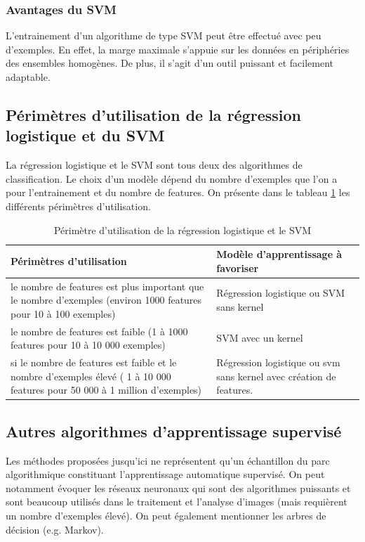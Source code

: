 \subsubsection{Avantages du SVM}
\label{Le Machine Learning: Les différents algorithmes: SVM: Avantage du SVM}
L'entrainement d'un algorithme de type SVM peut être effectué avec peu d'exemples. En effet, la marge maximale s'appuie sur les données en périphéries des ensembles homogènes. De plus, il s'agit d'un outil puissant et facilement adaptable.

\subsection{Périmètres d'utilisation de la régression logistique et du SVM}
\label{Le Machine Learning: Choix de la méthode à utiliser: Comparaison de la régression logistique et le SVM}
La régression logistique et le SVM sont tous deux des algorithmes de classification. Le choix d'un modèle dépend du nombre d'exemples que l'on a pour l'entrainement et du nombre de features. On présente dans le tableau \ref {tab:Périmètre d'utilisation de la régression logistique et le SVM} les différents périmètres d'utilisation.

\begin{table}[h]
	\begin{tabular}{ | p{7cm} | p{7cm} |}
		\hline
		Périmètres d'utilisation & Modèle d'apprentissage à favoriser \\
		\hline 
		le nombre de features est plus important que le nombre d'exemples (environ 1000 features pour 10 à 100 exemples) & Régression logistique ou SVM sans kernel \\
		\hline
		le nombre de features est faible (1 à 1000 features pour 10 à 10 000 exemples) & SVM avec un kernel \\
		\hline 
		si le nombre de features est faible et le nombre d'exemples élevé ( 1 à 10 000 features pour 50 000 à 1 million d'exemples) & Régression logistique ou svm sans kernel avec création de features. \\
		\hline
	\end{tabular}
	\caption[Périmètre d'utilisation de la régression logistique et le SVM]{Périmètre d'utilisation de la régression logistique et le SVM}
	\label {tab:Périmètre d'utilisation de la régression logistique et le SVM}
\end{table}

\subsection{Autres algorithmes  d'apprentissage supervisé}
\label{Le Machine Learning: Choix de la méthode à utiliser: Autres algorithmes pour l'apprentissage supervisé}
Les méthodes proposées jusqu'ici ne représentent qu'un échantillon du parc algorithmique constituant l'apprentissage automatique supervisé. On peut notamment évoquer les réseaux neuronaux qui sont des algorithmes puissants et sont beaucoup utilisés dans le traitement et l'analyse d'images (mais requièrent un nombre d'exemples élevé). On peut également mentionner les arbres de décision (e.g. Markov).